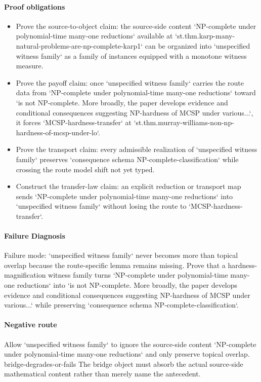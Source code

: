 \documentclass[11pt]{article}
\begin{document}
\paragraph{Proof obligations}
\begin{itemize}
\item Prove the source-to-object claim: the source-side content `NP-complete under polynomial-time many-one reductions` available at `st.thm.karp-many-natural-problems-are-np-complete-karp1` can be organized into `unspecified witness family` as a family of instances equipped with a monotone witness measure.
\item Prove the payoff claim: once `unspecified witness family` carries the route data from `NP-complete under polynomial-time many-one reductions` toward `is not NP-complete. More broadly, the paper develops evidence and conditional consequences suggesting NP-hardness of MCSP under various...`, it forces `MCSP-hardness-transfer` at `st.thm.murray-williams-non-np-hardness-of-mcsp-under-lo`.
\item Prove the transport claim: every admissible realization of `unspecified witness family` preserves `consequence schema NP-complete-classification` while crossing the route model shift not yet typed.
\item Construct the transfer-law claim: an explicit reduction or transport map sends `NP-complete under polynomial-time many-one reductions` into `unspecified witness family` without losing the route to `MCSP-hardness-transfer`.
\end{itemize}
\paragraph{Failure Diagnosis}
Failure mode: `unspecified witness family` never becomes more than topical overlap because the route-specific lemma remains missing. Prove that a hardness-magnification witness family turns `NP-complete under polynomial-time many-one reductions` into `is not NP-complete. More broadly, the paper develops evidence and conditional consequences suggesting NP-hardness of MCSP under various...` while preserving `consequence schema NP-complete-classification`.
\paragraph{Negative route}
Allow `unspecified witness family` to ignore the source-side content `NP-complete under polynomial-time many-one reductions` and only preserve topical overlap. bridge-degrades-or-fails The bridge object must absorb the actual source-side mathematical content rather than merely name the antecedent.
\end{document}
